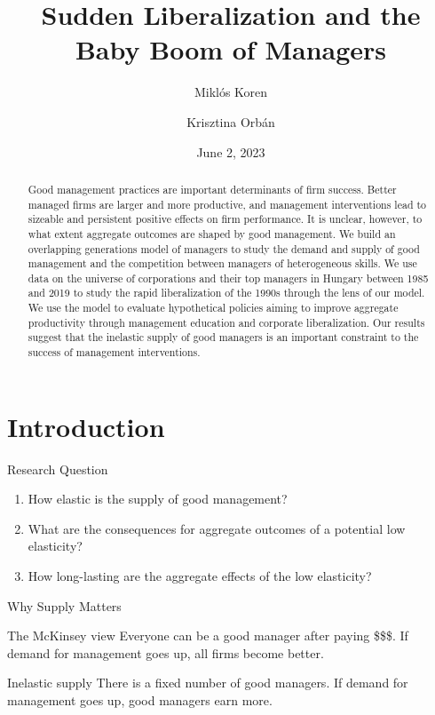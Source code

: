 \documentclass[
  ignorenonframetext,
  aspectratio=1610,
]{beamer}
\title{Sudden Liberalization and the Baby Boom of Managers}
\author{Miklós Koren \and Krisztina Orbán}
\date{June 2, 2023}
\providecommand{\tightlist}{%
  \setlength{\itemsep}{0pt}\setlength{\parskip}{0pt}}
\begin{document}
\frame{\titlepage}
\begin{abstract}
Good management practices are important determinants of firm success.
Better managed firms are larger and more productive, and management
interventions lead to sizeable and persistent positive effects on firm
performance. It is unclear, however, to what extent aggregate outcomes
are shaped by good management. We build an overlapping generations model
of managers to study the demand and supply of good management and the
competition between managers of heterogeneous skills. We use data on the
universe of corporations and their top managers in Hungary between 1985
and 2019 to study the rapid liberalization of the 1990s through the lens
of our model. We use the model to evaluate hypothetical policies aiming
to improve aggregate productivity through management education and
corporate liberalization. Our results suggest that the inelastic supply
of good managers is an important constraint to the success of management
interventions.
\end{abstract}

\hypertarget{introduction}{%
\section{Introduction}\label{introduction}}

\begin{frame}{Research Question}
\protect\hypertarget{research-question}{}
\begin{enumerate}
\tightlist
\item
  How elastic is the supply of good management?
\item
  What are the consequences for aggregate outcomes of a potential low
  elasticity?
\item
  How long-lasting are the aggregate effects of the low elasticity?
\end{enumerate}
\end{frame}

\begin{frame}{Why Supply Matters}
\protect\hypertarget{why-supply-matters}{}
\begin{block}{The McKinsey view}
\protect\hypertarget{the-mckinsey-view}{}
Everyone can be a good manager after paying \$\$\$. If demand for
management goes up, all firms become better.
\end{block}

\begin{block}{Inelastic supply}
\protect\hypertarget{inelastic-supply}{}
There is a fixed number of good managers. If demand for management goes
up, good managers earn more.
\end{block}
\end{frame}
\end{document}

